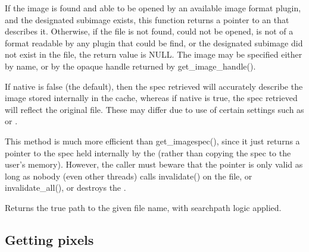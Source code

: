 If the image is found and able to be opened by an available
image format plugin, and the designated subimage exists, this function
returns a pointer to an \ImageSpec that describes it.  Otherwise, if the
file is not found, could not be opened, is not of a format readable by
any plugin that could be find, or the designated subimage did
not exist in the file, the return value is NULL.
The image may be specified either by name, or by the opaque handle returned
by {\cf get_image_handle()}.

If {\cf native} is {\cf false} (the default), then the spec retrieved
will accurately describe the image stored internally in the cache,
whereas if {\cf native} is {\cf true}, the spec retrieved will reflect
the original file.  These may differ due to use of certain \ImageCache
settings such as  or .

This method is much more efficient than {\cf get_imagespec()}, since it
just returns a pointer to the spec held internally by the \ImageCache
(rather than copying the spec to the user's memory).  However, the
caller must beware that the pointer is only valid as long as nobody
(even other threads) calls {\cf invalidate()} on the file, or {\cf
  invalidate_all()}, or destroys the \ImageCache.
\apiend

Returns the true path to the given file name, with searchpath logic
applied.
\apiend

\subsection{Getting pixels}
\label{sec:imagecache:api:getpixels}

